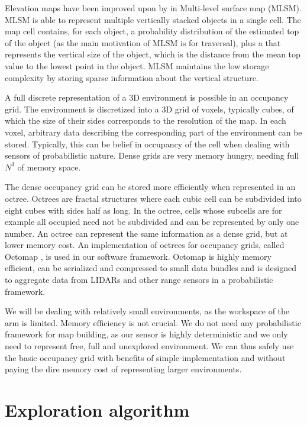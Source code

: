 \documentclass[buriama8_dp.tex]{subfiles}
\begin{document}
Elevation maps have been improved upon by \cite{multilevel} in Multi-level surface map (MLSM). MLSM is able to represent multiple vertically stacked objects in a single cell. The map cell contains, for each object, a probability distribution of the estimated top of the object (as the main motivation of MLSM is for traversal), plus a  that represents the vertical size of the object, which is the distance from the mean top value to the lowest point in the object. MLSM maintains the low storage complexity by storing sparse information about the vertical structure.

A full discrete representation of a 3D environment is possible in an occupancy grid. The environment is discretized into a 3D grid of voxels, typically cubes, of which the size of their sides corresponds to the resolution of the map. In each voxel, arbitrary data describing the corresponding part of the environment can be stored. Typically, this can be belief in occupancy of the cell when dealing with sensors of probabilistic nature. Dense grids are very memory hungry, needing full \(N^3\) of memory space.

The dense occupancy grid can be stored more efficiently when represented in an octree. Octrees are fractal structures where each cubic cell can be subdivided into eight cubes with sides half as long. In the octree, cells whose subcells are for example all occupied need not be subdivided and can be represented by only one number. An octree can represent the same information as a dense grid, but at lower memory cost. An implementation of octrees for occupancy grids, called Octomap \cite{octomap}, is used in our software framework. Octomap is highly memory efficient, can be serialized and compressed to small data bundles and is designed to aggregate data from LIDARs and other range sensors in a probabilistic framework.

We will be dealing with relatively small environments, as the workspace of the arm is limited. Memory efficiency is not crucial. We do not need any probabilistic framework for map building, as our sensor is highly deterministic and we only need to represent free, full and unexplored environment. We can thus safely use the basic occupancy grid with benefits of simple implementation and without paying the dire memory cost of representing larger environments.

\section{Exploration algorithm}
\end{document}
